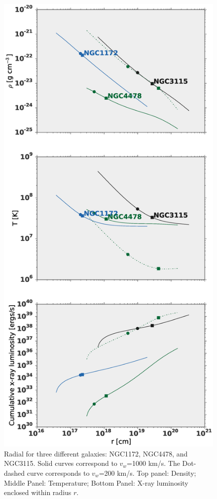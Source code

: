 \documentclass[usenatbib,fleqn]{mn2e}
\begin{document}
\begin{figure}
\includegraphics[width=\columnwidth]{profiles.eps}
\caption{\label{fig:profiles}Radial for three different galaxies: NGC1172, NGC4478, and NGC3115. Solid curves correspond to $v_w$=1000 km/s.
The Dot-dashed curve corresponds to $v_w$=200 km/s. Top panel: Density; 
Middle Panel: Temperature; Bottom Panel: X-ray luminosity enclosed within radius $r$.}
\end{figure}
\end{document}
